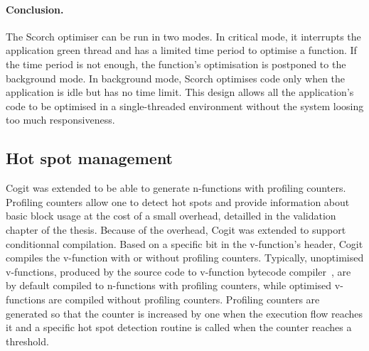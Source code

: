\documentclass[a4paper,12pt,twoside]{../includes/ThesisStyle}
\begin{document}

\paragraph{Conclusion.}The Scorch optimiser can be run in two modes. In critical mode, it interrupts the application green thread and has a limited time period to optimise a function. If the time period is not enough, the function's optimisation is postponed to the background mode. In background mode, Scorch optimises code only when the application is idle but has no time limit. This design allows all the application's code to be optimised in a single-threaded environment without the system loosing too much responsiveness.

\subsection{Hot spot management}
\label{sec:hotSpot}

Cogit was extended to be able to generate n-functions with profiling counters. Profiling counters allow one to detect hot spots and provide information about basic block usage at the cost of a small overhead, detailled in the validation chapter of the thesis. Because of the overhead, Cogit was extended to support conditionnal compilation. Based on a specific bit in the v-function's header, Cogit compiles the v-function with or without profiling counters. Typically, unoptimised v-functions, produced by the source code to v-function bytecode compiler~\cite{Bera13a}, are by default compiled to n-functions with profiling counters, while optimised v-functions are compiled without profiling counters. Profiling counters are generated so that the counter is increased by one when the execution flow reaches it and a specific hot spot detection routine is called when the counter reaches a threshold.
\end{document}
